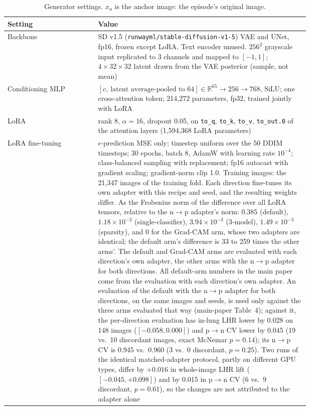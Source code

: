 \begin{table}[p]
\centering
\caption{Generator settings. $x_a$ is the anchor image: the episode's original image.}
\label{tab:repro-gen}
\small
\begin{tabular}{@{}l p{0.70\linewidth}@{}}
\toprule
Setting & Value \\
\midrule
Backbone & SD v1.5 (\texttt{runwayml/stable-diffusion-v1-5}) VAE and UNet, fp16, frozen except LoRA. Text encoder unused. $256^2$ grayscale input replicated to 3 channels and mapped to $[-1, 1]$; $4 \times 32 \times 32$ latent drawn from the VAE posterior (sample, not mean) \\
Conditioning MLP & $[c,\ \text{latent average-pooled to 64}] \in \mathbb{R}^{65} \to 256 \to 768$, SiLU; one cross-attention token; 214{,}272 parameters, fp32, trained jointly with LoRA \\
LoRA & rank 8, $\alpha = 16$, dropout 0.05, on \texttt{to\_q}, \texttt{to\_k}, \texttt{to\_v}, \texttt{to\_out.0} of the attention layers (1{,}594{,}368 LoRA parameters) \\
LoRA fine-tuning & $\epsilon$-prediction MSE only; timestep uniform over the 50 DDIM timesteps; 30 epochs, batch 8, AdamW with learning rate $10^{-4}$; class-balanced sampling with replacement; fp16 autocast with gradient scaling; gradient-norm clip 1.0. Training images: the 21{,}347 images of the training fold. Each direction fine-tunes its own adapter with this recipe and seed, and the resulting weights differ. As the Frobenius norm of the difference over all LoRA tensors, relative to the n$\to$p adapter's norm: 0.385 (default), $1.18\times10^{-2}$ (single-classifier), $3.94\times10^{-3}$ (3-model), $1.49\times10^{-3}$ (sparsity), and 0 for the Grad-CAM arm, whose two adapters are identical; the default arm's difference is 33 to 259 times the other arms'. The default and Grad-CAM arms are evaluated with each direction's own adapter, the other arms with the n$\to$p adapter for both directions. All default-arm numbers in the main paper come from the evaluation with each direction's own adapter. An evaluation of the default with the n$\to$p adapter for both directions, on the same images and seeds, is used only against the three arms evaluated that way (main-paper Table~4); against it, the per-direction evaluation has in-lung LHR lower by 0.028 on 148 images ($[-0.058, 0.000]$) and p$\to$n CV lower by 0.045 (19 vs.\ 10 discordant images, exact McNemar $p=0.14$); its n$\to$p CV is 0.945 vs.\ 0.960 (3 vs.\ 0 discordant, $p=0.25$). Two runs of the identical matched-adapter protocol, partly on different GPU types, differ by $+0.016$ in whole-image LHR lift ($[-0.045, +0.098]$) and by 0.015 in p$\to$n CV (6 vs.\ 9 discordant, $p=0.61$), so the changes are not attributed to the adapter alone \\

\end{tabular}
\end{table}
